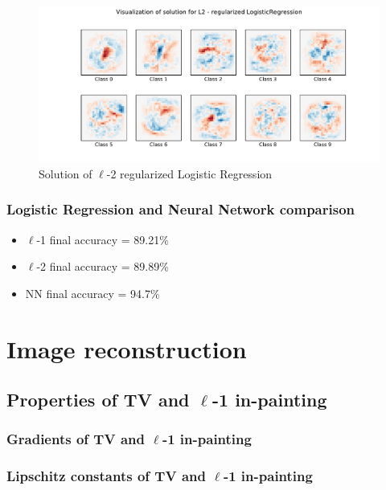\documentclass[12pt]{article}
\begin{document}
\begin{figure}
    \centering
    \includegraphics[width=17cm]{hw3/codes/exercise1/results/l2-numbers.pdf}
    \caption{Solution of $\ell$-2 regularized Logistic Regression}
    \label{fig:l2-solution}
\end{figure}

\subsubsection{Logistic Regression and Neural Network comparison}
\begin{itemize}
    \item $\ell$-1 final accuracy = 89.21\%
    \item $\ell$-2 final accuracy = 89.89\%
    \item NN final accuracy = 94.7\%
\end{itemize}

\section{Image reconstruction}
\subsection{Properties of TV and \texorpdfstring{$\ell$}{Lg}-1 in-painting}
\subsubsection{Gradients of TV and \texorpdfstring{$\ell$}{Lg}-1 in-painting}

\subsubsection{Lipschitz constants of TV and \texorpdfstring{$\ell$}{Lg}-1 in-painting}
\end{document}
